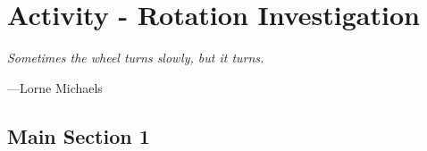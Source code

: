 
\chapter{Activity - Rotation Investigation} %

\label{Chapter5} %


\epigraph{\itshape Sometimes the wheel turns slowly, but it turns.}{---Lorne Michaels}

\section{Main Section 1}

\lipsum[1-2]